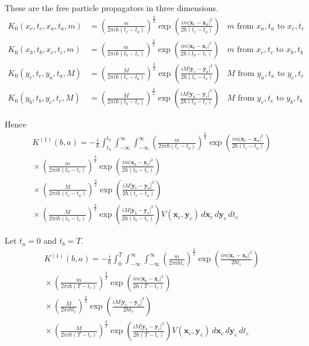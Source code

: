 These are the free particle propagators in three dimensions.
\begin{align*}
K_0(x_c,t_c,x_a,t_a,m)&=\left(\frac{m}{2\pi i\hbar(t_c-t_a)}\right)^\frac{3}{2}
\exp\left(\frac{im|\mathbf x_c-\mathbf x_a|^2}{2\hbar(t_c-t_a)}\right)
&\text{$m$ from $x_a,t_a$ to $x_c,t_c$}
\\
K_0(x_b,t_b,x_c,t_c,m)&=\left(\frac{m}{2\pi i\hbar(t_b-t_c)}\right)^\frac{3}{2}
\exp\left(\frac{im|\mathbf x_b-\mathbf x_c|^2}{2\hbar(t_b-t_c)}\right)
&\text{$m$ from $x_c,t_c$ to $x_b,t_b$}
\\
K_0(y_c,t_c,y_a,t_a,M)&=\left(\frac{M}{2\pi i\hbar(t_c-t_a)}\right)^\frac{3}{2}
\exp\left(\frac{iM|\mathbf y_c-\mathbf y_a|^2}{2\hbar(t_c-t_a)}\right)
&\text{$M$ from $y_a,t_a$ to $y_c,t_c$}
\\
K_0(y_b,t_b,y_c,t_c,M)&=\left(\frac{M}{2\pi i\hbar(t_b-t_c)}\right)^\frac{3}{2}
\exp\left(\frac{iM|\mathbf y_b-\mathbf y_c|^2}{2\hbar(t_b-t_c)}\right)
&\text{$M$ from $y_c,t_c$ to $y_b,t_b$}
\end{align*}

Hence
\begin{multline*}
K^{(1)}(b,a)=-\frac{i}{\hbar}\int_{t_a}^{t_b}\int_{-\infty}^\infty\int_{-\infty}^\infty
\left(\frac{m}{2\pi i\hbar(t_c-t_a)}\right)^\frac{3}{2}
\exp\left(\frac{im|\mathbf x_c-\mathbf x_a|^2}{2\hbar(t_c-t_a)}\right)
\\
{}\times
\left(\frac{m}{2\pi i\hbar(t_b-t_c)}\right)^\frac{3}{2}
\exp\left(\frac{im|\mathbf x_b-\mathbf x_c|^2}{2\hbar(t_b-t_c)}\right)
\\
{}\times
\left(\frac{M}{2\pi i\hbar(t_c-t_a)}\right)^\frac{3}{2}
\exp\left(\frac{iM|\mathbf y_c-\mathbf y_a|^2}{2\hbar(t_c-t_a)}\right)
\\
{}\times
\left(\frac{M}{2\pi i\hbar(t_b-t_c)}\right)^\frac{3}{2}
\exp\left(\frac{iM|\mathbf y_b-\mathbf y_c|^2}{2\hbar(t_b-t_c)}\right)
V(\mathbf x_c,\mathbf y_c)
\,d\mathbf x_c\,d\mathbf y_c\,dt_c
\end{multline*}

Let $t_a=0$ and $t_b=T$.
\begin{multline*}
K^{(1)}(b,a)=-\frac{i}{\hbar}\int_0^T\int_{-\infty}^\infty\int_{-\infty}^\infty
\left(\frac{m}{2\pi i\hbar t_c}\right)^\frac{3}{2}
\exp\left(\frac{im|\mathbf x_c-\mathbf x_a|^2}{2\hbar t_c}\right)
\\
{}\times
\left(\frac{m}{2\pi i\hbar(T-t_c)}\right)^\frac{3}{2}
\exp\left(\frac{im|\mathbf x_b-\mathbf x_c|^2}{2\hbar(T-t_c)}\right)
\\
{}\times
\left(\frac{M}{2\pi i\hbar t_c}\right)^\frac{3}{2}
\exp\left(\frac{iM|\mathbf y_c-\mathbf y_a|^2}{2\hbar t_c}\right)
\\
{}\times
\left(\frac{M}{2\pi i\hbar(T-t_c)}\right)^\frac{3}{2}
\exp\left(\frac{iM|\mathbf y_b-\mathbf y_c|^2}{2\hbar(T-t_c)}\right)
V(\mathbf x_c,\mathbf y_c)
\,d\mathbf x_c\,d\mathbf y_c\,dt_c
\end{multline*}



